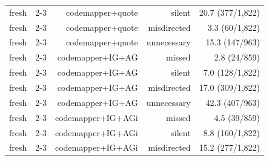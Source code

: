 \begin{table}[t]
{\begin{tabular}{@{}lrrrr@{}}
fresh & 2-3 & codemapper+quote & silent & 20.7 (377/1,822) \\
fresh & 2-3 & codemapper+quote & misdirected & 3.3 (60/1,822) \\
fresh & 2-3 & codemapper+quote & unnecessary & 15.3 (147/963) \\
fresh & 2-3 & codemapper+IG+AG & missed & 2.8 (24/859) \\
fresh & 2-3 & codemapper+IG+AG & silent & 7.0 (128/1,822) \\
fresh & 2-3 & codemapper+IG+AG & misdirected & 17.0 (309/1,822) \\
fresh & 2-3 & codemapper+IG+AG & unnecessary & 42.3 (407/963) \\
fresh & 2-3 & codemapper+IG+AGi & missed & 4.5 (39/859) \\
fresh & 2-3 & codemapper+IG+AGi & silent & 8.8 (160/1,822) \\
fresh & 2-3 & codemapper+IG+AGi & misdirected & 15.2 (277/1,822) \\
\bottomrule
\end{tabular}
}
\end{table}

